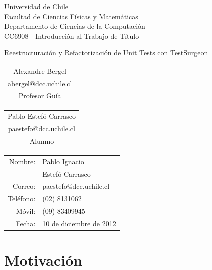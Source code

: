 \documentclass[12pt,spanish,letterpaper]{article}
\begin{document}
\thispagestyle{empty}
\begin{minipage}{\textwidth}
	Universidad de Chile\\
	Facultad de Ciencias Físicas y Matemáticas\\
	Departamento de Ciencias de la Computación\\
	CC6908 - Introducción al Trabajo de Título
\end{minipage}
\vfill
\begin{minipage}{\textwidth}
	\begin{center}
		\huge{Reestructuración y Refactorización de Unit Tests con TestSurgeon}
	\end{center}
\end{minipage}
\vfill
\begin{minipage}{\textwidth}
	\begin{tabular}{c}
		\hline
		Alexandre Bergel\\
		abergel@dcc.uchile.cl\\
		Profesor Guía
	\end{tabular}
	\hfill
	\begin{tabular}{c}
		\hline
		Pablo Estefó Carrasco\\
		paestefo@dcc.uchile.cl\\
		Alumno
	\end{tabular}
	\vspace{1.5cm}
\end{minipage}
\begin{minipage}{\textwidth}
	\null
	\hfill
	\begin{minipage}{3.25in}
		\begin{tabular}{rl}
			Nombre:&Pablo Ignacio\\
			&Estefó Carrasco\\
			Correo:&paestefo@dcc.uchile.cl\\
			Teléfono:&(02) 8131062\\
			Móvil:&(09) 83409945\\
			Fecha:&10 de diciembre de 2012
		\end{tabular}
	\end{minipage}
\end{minipage}
\newpage
{}
\tableofcontents
\newpage
{}


\section{Motivación}
\end{document}
